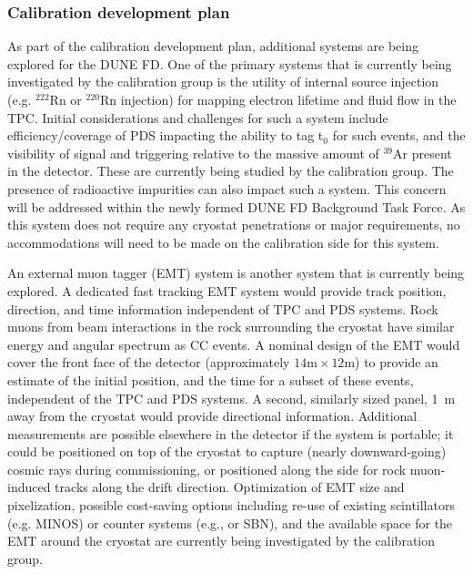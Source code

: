 \subsubsection{Calibration development plan}
\label{sec:phys-calib-devplan}

As part of the calibration development plan, additional systems are being explored for the DUNE FD. One of the primary systems that is currently being investigated by the calibration group is the utility of internal source injection (e.g. ${}^{222}$Rn or ${}^{220}$Rn injection) for mapping electron lifetime and fluid flow in the TPC. Initial considerations and challenges for such a system include  efficiency\slash coverage of PDS impacting the ability to tag t$_{0}$ for such events, and the visibility of signal and triggering relative to the massive amount of ${}^{39}$Ar present in the detector. These are currently being studied by the calibration group. The presence of radioactive impurities can also impact such a system. This concern will be addressed within the newly formed DUNE FD Background Task Force. As this system does not require any cryostat penetrations or major  requirements, no accommodations will need to be made on the calibration side for this system.

An external muon tagger (EMT) system is another %
system that is currently being explored. A dedicated fast tracking EMT system would provide track position, direction, and time information independent of TPC and PDS systems. Rock muons from beam interactions in the rock surrounding the cryostat have similar energy  and angular  spectrum as CC \numu events. A nominal design of the EMT would cover the front face of the detector (approximately $14\textrm{m} \times 12\textrm{m}$) to provide an estimate of the initial position, and the time for a subset of these events, independent of the TPC and PDS systems. A second, similarly sized panel, \SI{1}{\m} away from the cryostat would provide directional information. Additional measurements are possible elsewhere in the detector if the system is portable; it could be positioned on top of the cryostat to capture (nearly downward-going) cosmic rays during commissioning, or positioned along the side for rock muon-induced tracks along the drift direction. Optimization of EMT size and pixelization, possible cost-saving options including re-use of existing scintillators (e.g. MINOS) or counter systems (e.g.,  or SBN), and the available space for the EMT around the cryostat are currently being investigated by the calibration group. 

